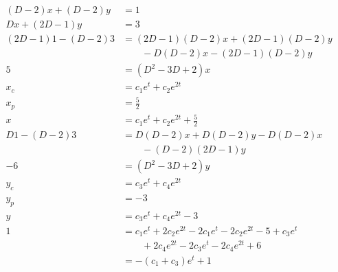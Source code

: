 \documentclass{article}
\begin{document}
\begin{align*}
  (D - 2) x + (D - 2) y   & = 1                                                                               \\
  D x + (2 D - 1) y       & = 3                                                                               \\
  (2 D - 1) 1 - (D - 2) 3 & = (2 D - 1) (D - 2) x + (2 D - 1) (D - 2) y                                       \\
                          & \qquad - D (D - 2) x - (2 D - 1) (D - 2) y                                        \\
  5                       & = (D^2 - 3 D + 2) x                                                               \\
  x_c                     & = c_1 e^t + c_2 e^{2 t}                                                           \\
  x_p                     & = \frac{5}{2}                                                                     \\
  x                       & = c_1 e^t + c_2 e^{2 t} + \frac{5}{2}                                             \\
  D 1 - (D - 2) 3         & = D (D - 2) x + D (D - 2) y - D (D - 2) x                                         \\
                          & \qquad - (D - 2) (2D - 1) y                                                       \\
  -6                      & = (D^2 - 3 D + 2) y                                                               \\
  y_c                     & = c_3 e^t + c_4 e^{2 t}                                                           \\
  y_p                     & = -3                                                                              \\
  y                       & = c_3 e^t + c_4 e^{2 t} - 3                                                       \\
  1                       & = c_1 e^t + 2 c_2 e^{2 t} - 2 c_1 e^t - 2 c_2 e^{2 t} - 5 + c_3 e^t               \\
                          & \qquad + 2 c_4 e^{2 t} - 2 c_3 e^t - 2 c_4 e^{2 t} + 6                            \\
                          & = -(c_1 + c_3) e^t + 1                                                            \\

\end{align*}
\end{document}

